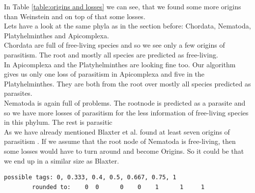       In Table \ref{table:origins and losses} we can see, that we found some more origins than Weinstein 
        and on top of that some losses. \\
      
      Lets have a look at the same phyla as in the section before: Chordata, Nematoda, 
        Platyhelminthes and Apicomplexa. \\
      Chordata are full of free-living species and so we see only a few origins of parasitism. The root
      and mostly all species are predicted as free-living. \\
      In Apicomplexa and the Platyhelminthes are looking fine too. Our algorithm gives us only one loss 
        of parasitism in Apicomplexa and five in the Platyhelminthes. They are both from the root over 
        mostly all species predicted as parasites. \\
      Nematoda is again full of problems. The rootnode is predicted as a parasite and so we have more 
        losses of parasitism for the less information of free-living species in this phylum. The rest 
        is parasitic \\
        As we have already mentioned Blaxter et al. found at least seven origins of parasitism 
          \cite{Blaxter1998}. If we assume that the root node of Nematoda is free-living, then some 
          losses would have to turn around and become Origins. So it could be that we end up in a similar 
          size as Blaxter.

      \begin{lstlisting}[gobble=6]
        possible tags: 0, 0.333, 0.4, 0.5, 0.667, 0.75, 1
        rounded to:    0  0      0    0    1      1     1
      \end{lstlisting}


      
